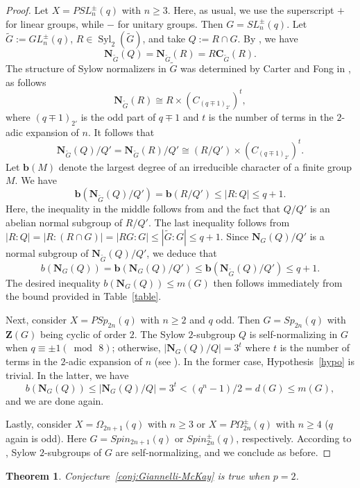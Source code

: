 \documentclass[12pt]{amsart}
\theoremstyle{plain}
\newtheorem{thm}{Theorem}[section]
\theoremstyle{definition}
\numberwithin{equation}{section}
\newcommand{\Syl}{\operatorname{Syl}}
\newcommand{\bN}{\mathbf{N}}
\newcommand{\bC}{{\mathbf{C}}}
\newcommand{\bZ}{{\mathbf{Z}}}
\begin{document}
\begin{proof}
Let $X=PSL^\pm_n(q)$ with $n\geq3$. Here, as usual, we use the
superscript $+$ for linear groups, while $-$ for unitary groups.
Then $G=SL^\pm_n(q)$. Let $\widetilde{G}:=GL_n^\pm(q)$,
$R\in\Syl_2(\widetilde{G})$, and take $Q:=R\cap G$. By
\cite[Theorem~1]{Kon05}, we have
\[\bN_{\widetilde{G}}(Q)=\bN_{\widetilde{G}}(R)=R\bC_{\widetilde{G}}(R).\]
The structure of Sylow normalizers in $\widetilde{G}$ was determined
by Carter and Fong in \cite[Lemma~6 and Theorem~4]{CF64}, as follows
\[
\bN_{\widetilde{G}}(R)\cong R\times (C_{(q \mp 1)_{2'}})^t,
\]
where $(q\mp 1)_{2'}$ is the odd part of $q\mp 1$ and $t$ is the
number of terms in the $2$-adic expansion of $n$. It follows that
\[\bN_{\widetilde{G}}(Q)/Q'=\bN_{\widetilde{G}}(R)/Q'\cong (R/Q')\times (C_{(q\mp
1)_{2'}})^t.\] Let $\textbf{b}(M)$ denote the largest degree of an
irreducible character of a finite group $M$. We have
\[
\textbf{b}(\bN_{\widetilde{G}}(Q)/Q')= \textbf{b}(R/Q')\leq
|R:Q|\leq q+1.
\]
Here, the inequality in the middle follows from
\cite[Corollary~11.29]{Is} and the fact that $Q/Q'$ is an abelian
normal subgroup of $R/Q'$. The last inequality follows from
$|R:Q|=|R:(R\cap G)|=|RG:G|\leq |\widetilde{G}:G|\leq q+1$. Since
$\bN_{G}(Q)/Q'$ is a normal subgroup of $\bN_{\widetilde{G}}(Q)/Q'$,
we deduce that
\[b(\bN_{G}(Q))= \textbf{b}(\bN_{G}(Q)/Q')\leq
\textbf{b}(\bN_{\widetilde{G}}(Q)/Q')\leq q+1.\] The desired
inequality $b(\bN_G(Q))\leq m(G)$ then follows immediately from the
bound provided in Table~\ref{table}.

Next, consider $X=PSp_{2n}(q)$ with $n\geq 2$ and $q$ odd. Then
$G=Sp_{2n}(q)$ with $\bZ(G)$ being cyclic of order $2$. The Sylow
$2$-subgroup $Q$ is self-normalizing in $G$ when $q\equiv \pm
1(\bmod\,8)$; otherwise, $|\bN_G(Q)/Q|=3^t$ where $t$ is the number
of terms in the $2$-adic expansion of $n$ (see
\cite[Theorem~4]{CF64}). In the former case, Hypothesis~\ref{hypo}
is trivial. In the latter, we have
\[
b(\bN_G(Q))\leq |\bN_G(Q)/Q| =3^t<(q^n-1)/2=d(G)\leq m(G),
\]
and we are done again.

Lastly, consider $X=\Omega_{2n+1}(q)$ with $n\geq 3$ or
$X=P\Omega_{2n}^\pm(q)$ with $n\geq 4$ ($q$ again is odd). Here
$G=Spin_{2n+1}(q)$ or $Spin_{2n}^\pm(q)$, respectively. According to
\cite[Theorem~5]{CF64}, Sylow $2$-subgroups of $G$ are
self-normalizing, and we conclude as before.
\end{proof}


\begin{thm}\label{thm:p=2Giannelli}
Conjecture~\ref{conj:Giannelli-McKay} is true when $p=2$.
\end{thm}
\end{document}
